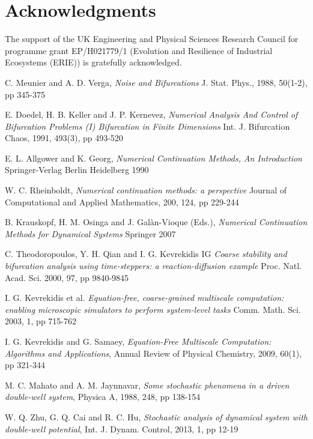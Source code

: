 \documentclass[11pt]{article}
\begin{document}
\section*{Acknowledgments}
{The support of the UK Engineering and Physical Sciences Research Council for programme grant EP/H021779/1 (Evolution and Resilience of Industrial Ecosystems (ERIE)) is gratefully acknowledged.}
 
 
\begin{thebibliography}{10}  

{\sc C. Meunier and A. D. Verga},
{\it Noise and Bifurcations}
J. Stat. Phys., 1988, 50(1-2), pp 345-375

{\sc E. Doedel, H. B. Keller and J. P. Kernevez},
{\it Numerical Analysis And Control of Bifurcation Problems (I) Bifurcation in Finite Dimensions}
Int. J. Bifurcation Chaos, 1991, 493(3), pp 493-520

{\sc E. L. Allgower and K. Georg},
{\it Numerical Continuation Methods, An Introduction}
Springer-Verlag Berlin Heidelberg 1990

{\sc W. C. Rheinboldt},
{\it Numerical continuation methods: a perspective}
Journal of Computational and Applied Mathematics, 200, 124, pp 229-244

{\sc B. Krauskopf, H. M. Osinga and J. Gal\`{a}n-Vioque (Eds.)},
{\it Numerical Continuation Methods for Dynamical Systems}
Springer 2007

{\sc C. Theodoropoulos, Y. H. Qian and I. G. Kevrekidis IG}
{\it Coarse stability and bifurcation analysis using time-steppers: a reaction-diffusion example}
Proc. Natl. Acad. Sci. 2000, 97, pp 9840-9845

{\sc I. G. Kevrekidis et al.} 
{\it Equation-free, coarse-grained multiscale computation: enabling microscopic simulators to perform system-level tasks}
Comm. Math. Sci. 2003, 1, pp 715-762 

{\sc I. G. Kevrekidis and G. Samaey},
{\it Equation-Free Multiscale Computation: Algorithms and Applications},
Annual Review of Physical Chemistry, 2009, 60(1), pp 321-344

{\sc M. C. Mahato and A. M. Jaynnavar},
{\it Some stochastic phenomena in a driven double-well system},
Physica A, 1988, 248, pp 138-154

{\sc W. Q. Zhu, G. Q. Cai and R. C. Hu},
{\it Stochastic analysis of dynamical system with double-well potential},
Int. J. Dynam. Control, 2013, 1, pp 12-19


\end{thebibliography}
\end{document}
